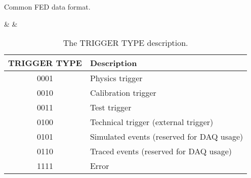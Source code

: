 \begin{landscape}
\thispagestyle{empty}
\begin{table}[htbp]
  \caption{Common FED data format.}\label{tab:commonformat}
    \begin{bittabular}{64}
      & \bitNumEightByte
      & \bitNumEightByte
    \end{bittabular}
\end{table}

\vspace{1cm}

\begin{table}[htbp]
\begin{center}
\caption{The TRIGGER TYPE description.}
\label{tab:TRIGGER_TYPE}
\begin{tabular}{|c|l|}   \hline 
{\bf TRIGGER TYPE} & {\bf Description} \\ \hline
0001 &  Physics trigger \\ \hline
0010 &  Calibration trigger \\ \hline
0011 &  Test trigger \\ \hline
0100 &  Technical trigger (external trigger) \\ \hline
0101 &  Simulated events (reserved for DAQ usage) \\ \hline
0110 &  Traced events (reserved for DAQ usage) \\ \hline
1111 &  Error \\ \hline
\end{tabular}
\end{center}
\end{table}


\end{landscape}




